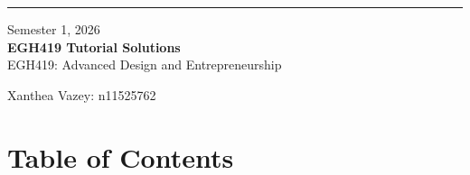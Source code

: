 \documentclass[10pt, twoside, a4paper]{article}
\newcommand{\TitleName}{EGH419 Tutorial Solutions}
\newcommand{\unitTime}{Semester 1, 2026}
\newcommand{\unitName}{EGH419: Advanced Design and Entrepreneurship}
\newcommand{\documentAuthors}{Xanthea Vazey: n11525762}
\begin{document}

    \begin{titlepage}
        \thispagestyle{empty}
        \vspace*{0.25\textheight}
        
        \noindent
        \begin{minipage}[t]{0.03\textwidth}

            \rule[-15ex]{1pt}{95pt}   %
        \end{minipage}
        \hspace{1em}
        \begin{minipage}[t]{0.9\textwidth}
            \normalsize{\unitTime} \\[1.5ex]
            \Huge\textbf{\TitleName} \\[1.5ex]
            \normalsize{\unitName}
        \end{minipage}
        \vfill

        \begin{flushleft}
            \documentAuthors
        \end{flushleft}
    \end{titlepage}     

    \newpage
    \section{Table of Contents}
    \begin{enumerate}

    \end{enumerate}

    \newpage

\end{document}
